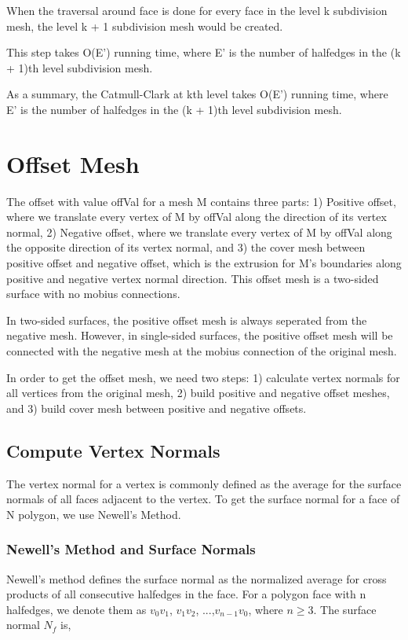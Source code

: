\documentclass[12pt]{article}
\begin{document}
When the traversal around face is done for every face in the level k subdivision mesh, the level k + 1 subdivision mesh would be created.

This step takes O(E') running time, where E' is the number of halfedges in the (k + 1)th level subdivision mesh.

As a summary, the Catmull-Clark at kth level takes O(E') running time, where E' is the number of halfedges in the (k + 1)th level subdivision mesh.

\section{Offset Mesh} \label{sec:offset}

The offset with value offVal for a mesh M contains three parts: 1) Positive offset, where we translate every vertex of M by offVal along the direction of its vertex normal, 2) Negative offset, where we translate every vertex of M by offVal along the opposite direction of its vertex normal, and 3) the cover mesh between positive offset and negative offset, which is the extrusion for M's boundaries along positive and negative vertex normal direction. This offset mesh is a two-sided surface with no mobius connections.

In two-sided surfaces, the positive offset mesh is always seperated from the negative mesh. However, in single-sided surfaces, the positive offset mesh will be connected with the negative mesh at the mobius connection of the original mesh.

In order to get the offset mesh, we need two steps: 1) calculate vertex normals for all vertices from the original mesh, 2) build positive and negative offset meshes, and 3) build cover mesh between positive and negative offsets.

\subsection{Compute Vertex Normals}
The vertex normal for a vertex is commonly defined as the average for the surface normals of all faces adjacent to the vertex. To get the surface normal for a face of N polygon, we use Newell's Method.

\subsubsection{Newell's Method and Surface Normals}
Newell's method defines the surface normal as the normalized average for cross products of all consecutive halfedges in the face. For a polygon face with n halfedges, we denote them as $v_0v_1$, $v_1v_2$, ...,$v_{n-1}v_0$, where $ n \ge 3$. The surface normal $N_{f}$ is,
\end{document}
